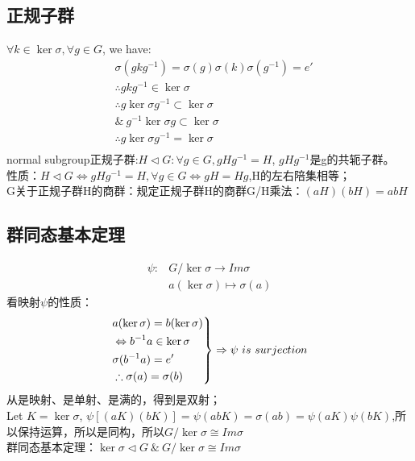 \subsection{正规子群}
$ \forall k \in \ker \sigma, \forall g\in G$, we have:
\begin{equation}
\begin{split}
&\sigma(gkg^{-1})=\sigma(g)\sigma(k)\sigma(g^{-1})=e'\\
& \therefore gkg^{-1}\in \ker \sigma\\
& \therefore g \ker \sigma g^{-1} \subset \ker \sigma\\
& \& \ g^{-1}  \ker \sigma g\subset \ker \sigma\\
& \therefore g \ker \sigma g^{-1}=\ker \sigma\\
\end{split}
\end{equation}
normal subgroup正规子群:$H \lhd G :\forall g \in G, gHg^{-1}=H$, $gHg^{-1}$是g的共轭子群。\\
性质：$H \lhd G \Leftrightarrow gHg^{-1}=H,\forall g \in G \Leftrightarrow gH=Hg$,H的左右陪集相等；\\
G关于正规子群H的商群：规定正规子群H的商群G/H乘法：$(aH)(bH)=abH$\\
\subsection{群同态基本定理}
\begin{equation}
\begin{split}
\psi : &G/ \ker \sigma \to Im \sigma\\
& a (\ker \sigma) \mapsto \sigma(a)
\end{split}
\end{equation}
看映射$\psi$的性质：
\begin{equation}
\label{证明同构1}
\left.
\begin{aligned}
& a(\ker \sigma)=b(\ker \sigma)\\
& \Leftrightarrow b^{-1}a \in \ker \sigma\\
&\sigma(b^{-1}a)=e'\\
&\therefore \sigma(a)=\sigma(b)
\end{aligned}
\right\} \Rightarrow \psi \ is \ surjection\\
\end{equation}
从是映射、是单射、是满的，得到是双射；\\
Let $K=\ker \sigma$, $\psi [(aK)(bK)]=\psi (abK)=\sigma(ab)=\psi(aK)\psi(bK)$,所以保持运算，所以是同构，所以$G/ \ker \sigma \cong Im \sigma$\\
群同态基本定理：$\ker \sigma \lhd G \ \& \   G/ \ker \sigma \cong Im \sigma  $ 



